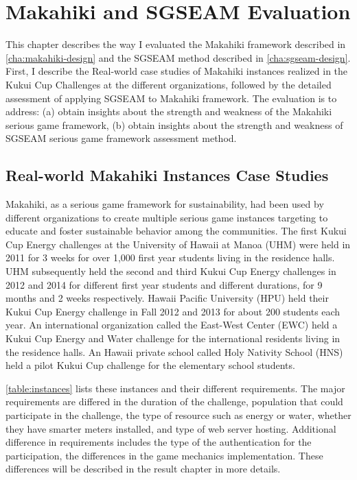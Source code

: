 \chapter{Makahiki and SGSEAM Evaluation}
\label{cha:evaluation}

This chapter describes the way I evaluated the Makahiki framework described in \autoref{cha:makahiki-design} and the SGSEAM method described in \autoref{cha:sgseam-design}. First, I describe the Real-world case studies of Makahiki instances realized in the Kukui Cup Challenges at the different organizations, followed by the detailed assessment of applying SGSEAM to Makahiki framework. The evaluation is to address:
(a) obtain insights about the strength and weakness of the Makahiki serious game framework, (b) obtain insights about the strength and weakness of SGSEAM serious game framework assessment method.

\section{Real-world Makahiki Instances Case Studies}

Makahiki, as a serious game framework for sustainability, had been used by different organizations to create multiple serious game instances targeting to educate and foster sustainable behavior among the communities. The first Kukui Cup Energy challenges at the University of Hawaii at Manoa (UHM) were held in 2011 for 3 weeks for over 1,000 first year students living in the residence halls. UHM subsequently held the second and third Kukui Cup Energy challenges in 2012 and 2014 for different first year students and different durations, for 9 months and 2 weeks respectively. Hawaii Pacific University (HPU) held their Kukui Cup Energy challenge in Fall 2012 and 2013 for about 200 students each year. An international organization called the East-West Center (EWC) held a Kukui Cup Energy and Water challenge for the international residents living in the residence halls. An Hawaii private school called Holy Nativity School (HNS) held a pilot Kukui Cup challenge for the elementary school students. 

\autoref{table:instances} lists these instances and their different requirements. The major requirements are differed in the duration of the challenge, population that could participate in the challenge, the type of resource such as energy or water, whether they have smarter meters installed, and type of web server hosting. Additional difference in requirements includes the type of the authentication for the participation, the differences in the game mechanics implementation. These differences will be described in the result chapter in more details.

